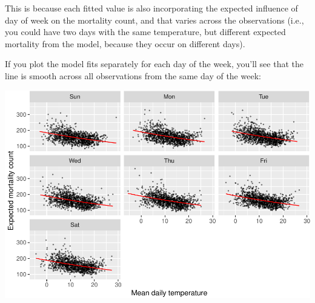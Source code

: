 \documentclass[
]{book}
\newenvironment{Shaded}{\begin{snugshade}}{\end{snugshade}}
\newcommand{\DataTypeTok}[1]{\textcolor[rgb]{0.13,0.29,0.53}{#1}}
\newcommand{\FloatTok}[1]{\textcolor[rgb]{0.00,0.00,0.81}{#1}}
\newcommand{\KeywordTok}[1]{\textcolor[rgb]{0.13,0.29,0.53}{\textbf{#1}}}
\newcommand{\NormalTok}[1]{#1}
\newcommand{\OperatorTok}[1]{\textcolor[rgb]{0.81,0.36,0.00}{\textbf{#1}}}
\newcommand{\StringTok}[1]{\textcolor[rgb]{0.31,0.60,0.02}{#1}}
\begin{document}
This is because each fitted value is also incorporating the expected influence
of day of week on the mortality count, and that varies across the observations
(i.e., you could have two days with the same temperature, but different
expected mortality from the model, because they occur on different days).

If you plot the model fits separately for each day of the week, you'll see that
the line is smooth across all observations from the same day of the week:

\begin{Shaded}
\end{Shaded}

\includegraphics{adv_epi_analysis_files/figure-latex/unnamed-chunk-41-1.pdf}
\end{document}
